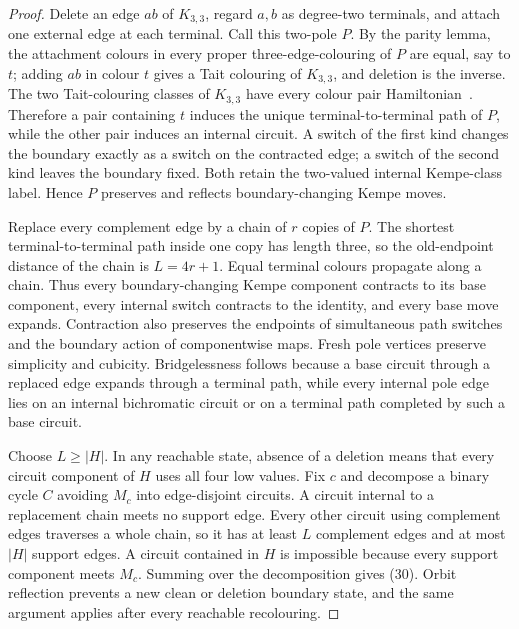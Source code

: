 \documentclass[11pt]{article}
\theoremstyle{definition}
\theoremstyle{remark}
\begin{document}
\begin{proof}
Delete an edge \(ab\) of \(K_{3,3}\), regard \(a,b\) as degree-two
terminals, and attach one external edge at each terminal.  Call this
two-pole \(P\).  By the parity lemma, the attachment colours in every
proper three-edge-colouring of \(P\) are equal, say to \(t\); adding
\(ab\) in colour \(t\) gives a Tait colouring of \(K_{3,3}\), and deletion
is the inverse.  The two Tait-colouring classes of \(K_{3,3}\) have every
colour pair Hamiltonian~\cite[Section~4.2]{BelcastroHaas2012}.  Therefore
a pair containing \(t\) induces the unique terminal-to-terminal path of
\(P\), while the other pair induces an internal circuit.  A switch of the
first kind changes the boundary exactly as a switch on the contracted
edge; a switch of the second kind leaves the boundary fixed.  Both retain
the two-valued internal Kempe-class label.  Hence \(P\) preserves and
reflects boundary-changing Kempe moves.

Replace every complement edge by a chain of \(r\) copies of \(P\).  The
shortest terminal-to-terminal path inside one copy has length three, so
the old-endpoint distance of the chain is \(L=4r+1\).  Equal terminal
colours propagate along a chain.  Thus every boundary-changing Kempe
component contracts to its base component, every internal switch
contracts to the identity, and every base move expands.  Contraction also
preserves the endpoints of simultaneous path switches and the boundary
action of componentwise maps.  Fresh pole vertices preserve simplicity
and cubicity.  Bridgelessness follows because a base circuit through a
replaced edge expands through a terminal path, while every internal pole
edge lies on an internal bichromatic circuit or on a terminal path
completed by such a base circuit.

Choose \(L\geq|H|\).  In any reachable state, absence of a deletion means
that every circuit component of \(H\) uses all four low values.  Fix \(c\)
and decompose a binary cycle \(C\) avoiding \(M_c\) into edge-disjoint
circuits.  A circuit internal to a replacement chain meets no support
edge.  Every other circuit using complement edges traverses a whole chain,
so it has at least \(L\) complement edges and at most \(|H|\) support
edges.  A circuit contained in \(H\) is impossible because every support
component meets \(M_c\).  Summing over the decomposition gives (30).
Orbit reflection prevents a new clean or deletion boundary state, and the
same argument applies after every reachable recolouring.
\end{proof}
\end{document}
